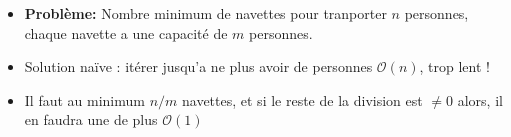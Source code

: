 \begin{frame}
    \frametitle{\problemtitle}
    \begin{itemize}
        \item<+-> \textbf{Problème:} Nombre minimum de navettes pour tranporter $n$ personnes, chaque navette a une capacité de $m$ personnes.
        \item Solution na\"ive : itérer jusqu'a ne plus avoir de personnes $\mathcal O(n)$, trop lent !
        \item<+->  Il faut au minimum $n / m$ navettes, et si le reste de la division est $\ne 0$ alors, il en faudra une de plus $\mathcal O(1)$
    \end{itemize}
\end{frame}
